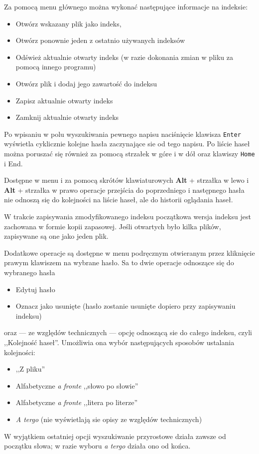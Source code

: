 \documentclass{mwart}
\def\key#1{\textbf{#1}}
\begin{document}
Za pomocą menu głównego można wykonać następujące informacje na
indeksie:
\begin{itemize}
\item Otwórz wskazany plik jako indeks,
\item Otwórz ponownie jeden z ostatnio używanych indeksów
\item Odśwież aktualnie otwarty indeks (w razie dokonania zmian w
  pliku za pomocą innego programu)
\item Otwórz plik i dodaj jego zawartość do indeksu
\item Zapisz aktualnie otwarty indeks
\item Zamknij aktualnie otwarty indeks
\end{itemize} 

Po wpisaniu w polu wyszukiwania pewnego napisu naciśnięcie klawisza
\texttt{Enter} wyświetla cyklicznie kolejne hasła zaczynające sie od
tego napisu. Po liście haseł można poruszać się również za pomocą
strzałek w góre i w dół oraz klawiszy \texttt{Home} i \textup{End}.

Dostępne w menu i za pomocą skrótów klawiaturowych \key{Alt} +
strzałka w lewo i \key{Alt} + strzałka w prawo operacje przejścia do
poprzedniego i następnego hasła nie odnoszą się do kolejności na
liście haseł, ale do historii oglądania haseł.

W trakcie zapisywania zmodyfikowanego indeksu początkowa wersja
indeksu jest zachowana w formie kopii zapasowej. Jeśli otwartych było
kilka plików, zapisywane są one jako jeden plik.

Dodatkowe operacje są dostępne w menu podręcznym otwieranym przez
kliknięcie prawym klawiszem na wybrane hasło. Sa to dwie operacje
odnoszące się do wybranego hasła
\begin{itemize}
\item Edytuj hasło
\item Oznacz jako usunięte (hasło zostanie usunięte dopiero przy
  zapisywaniu indeksu)
\end{itemize}
oraz --- ze względów technicznych --- opcję odnoszącą sie do całego
indeksu, czyli ,,Kolejność haseł''. Umożliwia ona wybór następujących
sposobów ustalania kolejności:
\begin{itemize}
\item ,,Z pliku''
\item  Alfabetyczne \textit{a fronte} ,,słowo po słowie''
\item Alfabetyczne \textit{a fronte} ,,litera po literze''
\item \textit{A tergo} (nie wyświetlają sie opisy ze względów
  technicznych)
\end{itemize}
W wyjątkiem ostatniej opcji wyszukiwanie przyrostowe działa zawsze od
początku słowa; w razie wyboru \textit{a tergo} działa ono od końca.
\end{document}
